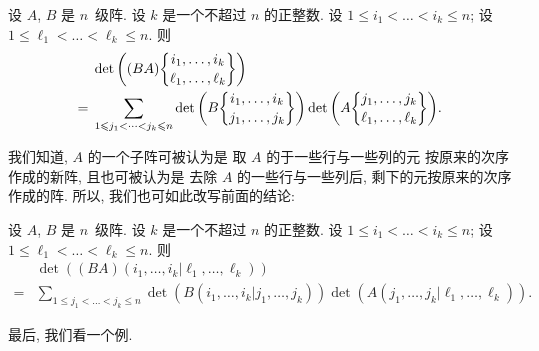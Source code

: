 \documentclass[../libro.tex]{subfiles}
\begin{document}
\begin{theorem}
    设 \(A\), \(B\) 是 \(n\)~级阵.
    设 \(k\) 是一个不超过 \(n\) 的正整数.
    设 \(1 \leq i_1 < \dots < i_k \leq n\);
    设 \(1 \leq \ell_1 < \dots < \ell_k \leq n\).
    则
    \begin{align*}
        & \det {\left(
                (BA)\submat{i_1,\dots,i_k}{\ell_1,\dots,\ell_k}
        \right)}
        \\
        = {} & \sum_{1 \leq j_1 < \dots < j_k \leq n}
        {
            \det {\left(
                    B\submat{i_1, \dots, i_k}{j_1, \dots, j_k}
            \right)}
            \det {\left(
                    A\submat{j_1, \dots, j_k}{\ell_1, \dots, \ell_k}
            \right)}
        }.
    \end{align*}
\end{theorem}

我们知道, \(A\) 的一个子阵可被认为是%
取 \(A\) 的于一些行与一些列的元%
按原来的次序作成的新阵,
且也可被认为是%
去除 \(A\) 的一些行与一些列后,
剩下的元按原来的次序作成的阵.
所以, 我们也可如此改写前面的结论:

\begin{theorem}
    设 \(A\), \(B\) 是 \(n\)~级阵.
    设 \(k\) 是一个不超过 \(n\) 的正整数.
    设 \(1 \leq i_1 < \dots < i_k \leq n\);
    设 \(1 \leq \ell_1 < \dots < \ell_k \leq n\).
    则
    \begin{align*}
        & \det {(
                (BA)({i_1,\dots,i_k}|{\ell_1,\dots,\ell_k})
        )}
        \\
        = {} & \sum_{1 \leq j_1 < \dots < j_k \leq n}
        {
            \det {(
                    B({i_1, \dots, i_k}|{j_1, \dots, j_k})
            )}
            \det {(
                    A({j_1, \dots, j_k}|{\ell_1, \dots, \ell_k})
            )}
        }.
    \end{align*}
\end{theorem}

最后, 我们看一个例.
\end{document}
